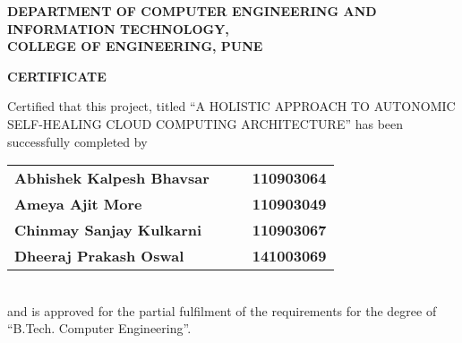 % 
\thispagestyle{empty}
\linespread{2}
\begin{center}			%
	\Large{\bf{DEPARTMENT OF COMPUTER ENGINEERING AND\\  INFORMATION TECHNOLOGY,\\ 
	       COLLEGE OF ENGINEERING, PUNE\\}}	
\end{center}

\vspace{20pt}			%

\begin{center}
	\Large{\bf{CERTIFICATE\\}}
\end{center}

\vspace{20pt}

\linespread{2}			%
\selectfont
\large{
Certified that this project, titled ``A HOLISTIC APPROACH TO AUTONOMIC SELF-HEALING CLOUD COMPUTING ARCHITECTURE''
has been successfully completed by \\ 
\begin{table}[htbp]
	\begin{center}
	\begin{tabular}{ l c c l }
	\Large\bf{Abhishek Kalpesh Bhavsar} & & & \Large\bf{110903064} \\[0.3cm] 
	\Large\bf{Ameya Ajit More} & & & \Large\bf{110903049} \\[0.3cm] 
	\Large\bf{Chinmay Sanjay Kulkarni} & & & \Large\bf{110903067} \\[0.3cm] 
	\Large\bf{Dheeraj Prakash Oswal} & & & \Large\bf{141003069} \\
	\end{tabular}
	\end{center}
	\end{table} \\
and is approved for the partial fulfilment of the requirements for the degree of 
``B.Tech. Computer Engineering''.
}

\vspace{20pt}

